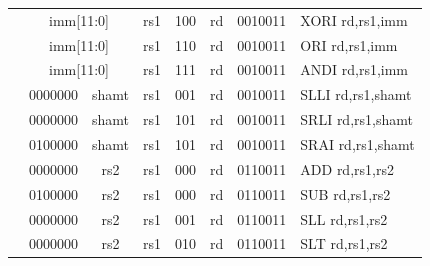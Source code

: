 \documentclass[11pt]{article}
\begin{document}
{\begin{table}[H]
\begin{small}
\begin{center}
\begin{tabular}{p{0in}p{0.4in}p{0.05in}p{0.05in}p{0.05in}p{0.05in}p{0.4in}p{0.6in}p{0.4in}p{0.6in}p{0.7in}l}
&
\multicolumn{6}{|c|}{imm[11:0]} &
\multicolumn{1}{c|}{rs1} &
\multicolumn{1}{c|}{100} &
\multicolumn{1}{c|}{rd} &
\multicolumn{1}{c|}{0010011} & XORI rd,rs1,imm \\
\cline{2-11}


&
\multicolumn{6}{|c|}{imm[11:0]} &
\multicolumn{1}{c|}{rs1} &
\multicolumn{1}{c|}{110} &
\multicolumn{1}{c|}{rd} &
\multicolumn{1}{c|}{0010011} & ORI rd,rs1,imm \\
\cline{2-11}


&
\multicolumn{6}{|c|}{imm[11:0]} &
\multicolumn{1}{c|}{rs1} &
\multicolumn{1}{c|}{111} &
\multicolumn{1}{c|}{rd} &
\multicolumn{1}{c|}{0010011} & ANDI rd,rs1,imm \\
\cline{2-11}


&
\multicolumn{4}{|c|}{0000000} &
\multicolumn{2}{c|}{shamt} &
\multicolumn{1}{c|}{rs1} &
\multicolumn{1}{c|}{001} &
\multicolumn{1}{c|}{rd} &
\multicolumn{1}{c|}{0010011} & SLLI rd,rs1,shamt \\
\cline{2-11}


&
\multicolumn{4}{|c|}{0000000} &
\multicolumn{2}{c|}{shamt} &
\multicolumn{1}{c|}{rs1} &
\multicolumn{1}{c|}{101} &
\multicolumn{1}{c|}{rd} &
\multicolumn{1}{c|}{0010011} & SRLI rd,rs1,shamt \\
\cline{2-11}


&
\multicolumn{4}{|c|}{0100000} &
\multicolumn{2}{c|}{shamt} &
\multicolumn{1}{c|}{rs1} &
\multicolumn{1}{c|}{101} &
\multicolumn{1}{c|}{rd} &
\multicolumn{1}{c|}{0010011} & SRAI rd,rs1,shamt \\
\cline{2-11}


&
\multicolumn{4}{|c|}{0000000} &
\multicolumn{2}{c|}{rs2} &
\multicolumn{1}{c|}{rs1} &
\multicolumn{1}{c|}{000} &
\multicolumn{1}{c|}{rd} &
\multicolumn{1}{c|}{0110011} & ADD rd,rs1,rs2 \\
\cline{2-11}


&
\multicolumn{4}{|c|}{0100000} &
\multicolumn{2}{c|}{rs2} &
\multicolumn{1}{c|}{rs1} &
\multicolumn{1}{c|}{000} &
\multicolumn{1}{c|}{rd} &
\multicolumn{1}{c|}{0110011} & SUB rd,rs1,rs2 \\
\cline{2-11}


&
\multicolumn{4}{|c|}{0000000} &
\multicolumn{2}{c|}{rs2} &
\multicolumn{1}{c|}{rs1} &
\multicolumn{1}{c|}{001} &
\multicolumn{1}{c|}{rd} &
\multicolumn{1}{c|}{0110011} & SLL rd,rs1,rs2 \\
\cline{2-11}


&
\multicolumn{4}{|c|}{0000000} &
\multicolumn{2}{c|}{rs2} &
\multicolumn{1}{c|}{rs1} &
\multicolumn{1}{c|}{010} &
\multicolumn{1}{c|}{rd} &
\multicolumn{1}{c|}{0110011} & SLT rd,rs1,rs2 \\
\cline{2-11}



\end{tabular}
\end{center}
\end{small}
\end{table}}
\end{document}
